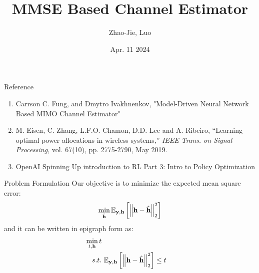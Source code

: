 \documentclass[hyperref={bookmarks=false}]{beamer}
\title{MMSE Based Channel Estimator}
\author{Zhao-Jie, Luo}
\institute[NYCU] %
{
\textit{janny00kevin@gmail.com} %
\\
\medskip
Advisor: Professor Carrson C. Fung\\ 
\medskip
National Yang Ming Chiao Tung University \\ %
}
\date{Apr. 11 2024}
\begin{document}
\frame{\titlepage}

\begin{frame}{Reference}
\begin{enumerate}
    \item  Carrson C. Fung, and Dmytro Ivakhnenkov, "Model-Driven Neural Network Based MIMO Channel Estimator"
    \item M. Eisen, C. Zhang, L.F.O. Chamon, D.D. Lee and A. Ribeiro, ``Learning optimal power allocations in wireless systems,'' \emph{IEEE Trans. on Signal Processing}, vol. 67(10), pp. 2775-2790, May 2019.
    \item OpenAI Spinning Up introduction to RL Part 3: Intro to Policy Optimization %
\end{enumerate}

\end{frame}


\begin{frame}{Problem Formulation}
Our objective is to minimize the expected mean square error:
\begin{align*}
    \min_{\hat{{\bf h}}} \mathbb{E}_{{\bf y},{\bf h}}\left[\left\| {\bf h}-\hat{{\bf h}} \right\|^2_2 \right]\\
\end{align*}
and it can be written in epigraph form as:
\begin{align*}
    \min_{t,{\bf h}} {t}\\
    s.t. &\ \mathbb{E}_{{\bf y},{\bf h}}\left[\left\| {\bf h}-\hat{{\bf h}} \right\|^2_2 \right] \leq t\\
\end{align*}

\end{frame}
\end{document}
